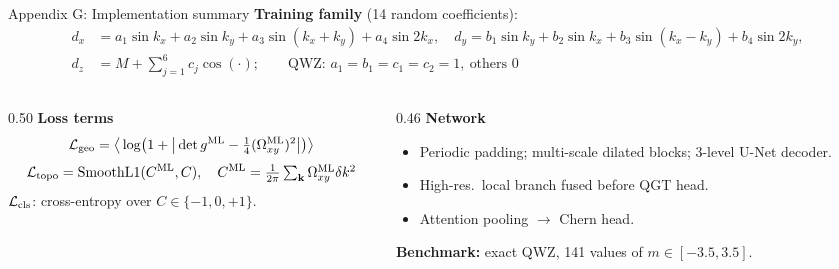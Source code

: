 \documentclass[aspectratio=169,11pt]{beamer}
\newcommand{\ML}{\mathrm{ML}}
\begin{document}
\begin{frame}{Appendix G: Implementation summary}
\scriptsize
\textbf{Training family} (14 random coefficients):
\[
\begin{aligned}
d_x&=a_1\sin k_x+a_2\sin k_y+a_3\sin(k_x{+}k_y)+a_4\sin 2k_x,\quad
d_y=b_1\sin k_y+b_2\sin k_x+b_3\sin(k_x{-}k_y)+b_4\sin 2k_y,\\
d_z&=M+\textstyle\sum_{j=1}^{6}c_j\cos(\cdot);\qquad
\text{QWZ: }a_1=b_1=c_1=c_2=1,\ \text{others }0
\end{aligned}
\]
\begin{columns}[T]
\begin{column}{0.50\textwidth}
\textbf{Loss terms}
\[
\mathcal L_{\rm geo}=\big\langle\log\!\big(1+\big|\det g^{\ML}-\tfrac14(\Omega^{\ML}_{xy})^2\big|\big)\big\rangle
\]
\[
\mathcal L_{\rm topo}=\mathrm{SmoothL1}(C^{\ML},C),\quad
C^{\ML}=\tfrac1{2\pi}\textstyle\sum_{\mathbf k}\Omega^{\ML}_{xy}\delta k^2
\]
$\mathcal L_{\rm cls}$: cross-entropy over $C\in\{-1,0,+1\}$.
\end{column}
\begin{column}{0.46\textwidth}
\textbf{Network}
\begin{itemize}
    \item Periodic padding; multi-scale dilated blocks; 3-level U-Net decoder.
    \item High-res.\ local branch fused before QGT head.
    \item Attention pooling $\rightarrow$ Chern head.
\end{itemize}
\textbf{Benchmark:} exact QWZ, 141 values of $m\in[-3.5,3.5]$.
\end{column}
\end{columns}
\end{frame}
\end{document}
